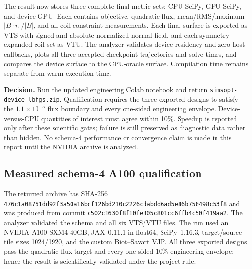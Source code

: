 \documentclass[11pt,a4paper]{article}
\newcommand{\code}[1]{\texttt{#1}}
\begin{document}
The result now stores three complete final metric sets: CPU SciPy, GPU SciPy,
and device GPU.  Each contains objective, quadratic flux, mean/RMS/maximum
$|B\cdot n|/|B|$, and all coil-constraint measurements.  Each final surface is
exported as VTS with signed and absolute normalized normal field, and each
symmetry-expanded coil set as VTU.  The analyzer validates device residency and
zero host callbacks, plots all three accepted-checkpoint trajectories and solve
times, and compares the device surface to the CPU-oracle surface.  Compilation
time remains separate from warm execution time.

\textbf{Decision.}  Run the updated engineering Colab notebook and return
\code{simsopt-device-lbfgs.zip}.  Qualification requires the three exported
designs to satisfy the $1.1\times10^{-5}$ flux boundary and every one-sided
engineering envelope.  Device-versus-CPU quantities of interest must agree
within 10\%.  Speedup is reported only after these scientific gates; failure is
still preserved as diagnostic data rather than hidden.  No schema-4 performance
or convergence claim is made in this report until the NVIDIA archive is
analyzed.

\subsection{Measured schema-4 A100 qualification}

The returned archive has SHA-256
\code{476c1a08761dd92f3a50a16bdf126bd210c2226cdabdd6ad5e86b750498c53f8}
and was produced from commit \code{c502c1630f8f10fe805c801cc6ffb4c50f419aa2}.
The analyzer validated the schema and all six VTS/VTU files.  The run used an
NVIDIA A100-SXM4-40GB, JAX~0.11.1 in float64, SciPy~1.16.3, target/source tile
sizes 1024/1920, and the custom Biot--Savart VJP.  All three exported designs
pass the quadratic-flux target and every one-sided 10\% engineering envelope;
hence the result is scientifically validated under the project rule.
\end{document}
